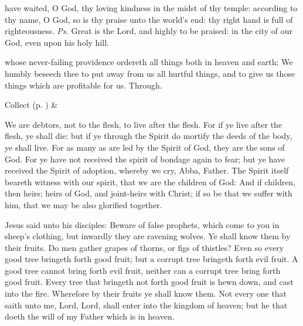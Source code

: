 
\introit
{} have waited, O God, thy loving kindness in the midst of thy temple: according to thy name, O God, so is thy praise unto the world's end: thy right hand is full of righteousness. \textit{Ps.} Great is the Lord, and highly to be praised: in the city of our God, even upon his holy hill.

\collect
{} whose never-failing providence ordereth all things both in heaven and earth; We humbly beseech thee to put away from us all hurtful things, and to give us those things which are profitable for us. Through.
\begin{rubric}
     Collect  (p. \pageref{SPSaints}) \&  
\end{rubric}

 We are debtors, not to the flesh, to live after the flesh. For if ye live after the flesh, ye shall die: but if ye through the Spirit do mortify the deeds of the body, ye shall live. For as many as are led by the Spirit of God, they are the sons of God. For ye have not received the spirit of bondage again to fear; but ye have received the Spirit of adoption, whereby we cry, Abba, Father. The Spirit itself beareth witness with our spirit, that we are the children of God: And if children, then heirs; heirs of God, and joint-heirs with Christ; if so be that we suffer with him, that we may be also glorified together.



\clearpage
{}
 Jesus said unto his disciples: Beware of false prophets, which come to you in sheep's clothing, but inwardly they are ravening wolves. Ye shall know them by their fruits. Do men gather grapes of thorns, or figs of thistles? Even so every good tree bringeth forth good fruit; but a corrupt tree bringeth forth evil fruit. A good tree cannot bring forth evil fruit, neither can a corrupt tree bring forth good fruit. Every tree that bringeth not forth good fruit is hewn down, and cast into the fire. Wherefore by their fruits ye shall know them. Not every one that saith unto me, Lord, Lord, shall enter into the kingdom of heaven; but he that doeth the will of my Father which is in heaven.

